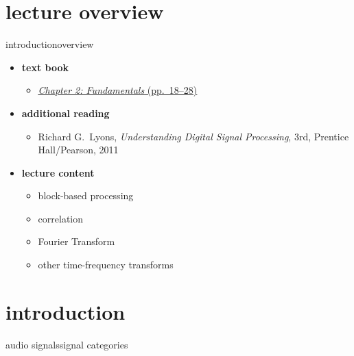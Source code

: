 

\subtitle{Part 3.2: Fundamentals II}


	

    \section[overview]{lecture overview}
        \begin{frame}{introduction}{overview}
            \begin{itemize}
                \item   \textbf{text book}  
                    \begin{itemize}
                        \item   \href{http://ieeexplore.ieee.org/xpl/ebooks/bookPdfWithBanner.jsp?fileName=6331119.pdf&bkn=6266785&pdfType=chapter}{\underline{\textit{Chapter 2: Fundamentals} (pp.~18--28)}}
                    \end{itemize}
                \item   \textbf{additional reading}  
                    \begin{itemize}
                        \item   Richard G.~Lyons, \textit{Understanding Digital Signal Processing}, 3rd, Prentice Hall/Pearson, 2011
                    \end{itemize}
                \bigskip
                \item<2->   \textbf{lecture content}
                    \begin{itemize}
                        \item<2->   block-based processing
                        \item<3->   correlation
                        \item<4->   Fourier Transform
                        \item<5->   other time-frequency transforms
                    \end{itemize}
            \end{itemize}
        \end{frame}
        
    \section[intro]{introduction}
        \begin{frame}{audio signals}{signal categories}
        \end{frame}

